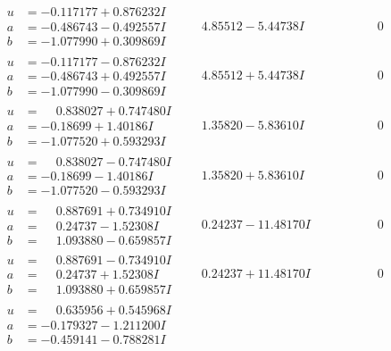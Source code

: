 \documentclass[1p]{elsarticle_modified}
\theoremstyle{definition}
\begin{document}
$$\begin{array}{c|c|c}
\begin{aligned}
u &= -0.117177 + 0.876232 I \\
a &= -0.486743 - 0.492557 I \\
b &= -1.077990 + 0.309869 I\end{aligned}
 & \phantom{-}4.85512 - 5.44738 I & \phantom{-0.000000 } 0 \\ \hline\begin{aligned}
u &= -0.117177 - 0.876232 I \\
a &= -0.486743 + 0.492557 I \\
b &= -1.077990 - 0.309869 I\end{aligned}
 & \phantom{-}4.85512 + 5.44738 I & \phantom{-0.000000 } 0 \\ \hline\begin{aligned}
u &= \phantom{-}0.838027 + 0.747480 I \\
a &= -0.18699 + 1.40186 I \\
b &= -1.077520 + 0.593293 I\end{aligned}
 & \phantom{-}1.35820 - 5.83610 I & \phantom{-0.000000 } 0 \\ \hline\begin{aligned}
u &= \phantom{-}0.838027 - 0.747480 I \\
a &= -0.18699 - 1.40186 I \\
b &= -1.077520 - 0.593293 I\end{aligned}
 & \phantom{-}1.35820 + 5.83610 I & \phantom{-0.000000 } 0 \\ \hline\begin{aligned}
u &= \phantom{-}0.887691 + 0.734910 I \\
a &= \phantom{-}0.24737 - 1.52308 I \\
b &= \phantom{-}1.093880 - 0.659857 I\end{aligned}
 & \phantom{-}0.24237 - 11.48170 I & \phantom{-0.000000 } 0 \\ \hline\begin{aligned}
u &= \phantom{-}0.887691 - 0.734910 I \\
a &= \phantom{-}0.24737 + 1.52308 I \\
b &= \phantom{-}1.093880 + 0.659857 I\end{aligned}
 & \phantom{-}0.24237 + 11.48170 I & \phantom{-0.000000 } 0 \\ \hline\begin{aligned}
u &= \phantom{-}0.635956 + 0.545968 I \\
a &= -0.179327 - 1.211200 I \\
b &= -0.459141 - 0.788281 I\end{aligned}

\end{array}$$
\end{document}
